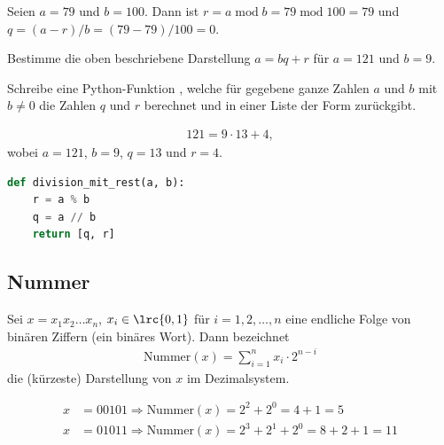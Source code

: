 \begin{myexample}
Seien $a=79$ und $b=100$. Dann ist  $r = a\; \text{mod}\; b = 79\; \text{mod}\; 100 = 79$ und $q = (a-r)/b = (79-79)/100 = 0$.
\end{myexample}

\begin{myexercise}
	\begin{aenum}
		\item Bestimme die oben beschriebene Darstellung $a = bq + r$ für $a = 121$ und $b = 9$.
		\item Schreibe eine Python-Funktion , welche für gegebene ganze Zahlen $a$ und $b$ mit $b \neq 0$ die Zahlen $q$ und $r$ berechnet und in einer Liste der Form \pythoninline{[q, r]} zurückgibt.
	\end{aenum}
	\begin{myanswer}
		\begin{aenum}
			\item \begin{align*}
				121 = 9\cdot 13 + 4,
			\end{align*}
			wobei $a = 121$, $b = 9$, $q = 13$ und $r = 4$.
			\item \phantom{1}
			\begin{lstlisting}[language=Python,caption=Division mit Rest,numbers=none]
def division_mit_rest(a, b):
    r = a % b
    q = a // b
    return [q, r]
\end{lstlisting}
		\end{aenum}
	\end{myanswer}
\end{myexercise}

\subsection{Nummer}
Sei $x=x_1x_2\ldots x_n$, $x_i\in\lrc{0,1}$ für $i=1,2,\ldots, n$ eine endliche Folge von binären Ziffern (ein binäres Wort). Dann bezeichnet
\begin{align}
	\text{Nummer}(x)=\displaystyle\sum_{i=1}^n x_i\cdot 2^{n-i}
\end{align}
die (kürzeste) Darstellung von $x$ im Dezimalsystem.

\begin{myexample}
\begin{align*}
	x & = 00101 \Rightarrow \text{Nummer}(x) = 2^2 + 2^0 = 4 + 1 = 5            \\
	x & = 01011 \Rightarrow \text{Nummer}(x) = 2^3 + 2^1  + 2^0 = 8+ 2 + 1 = 11
\end{align*}
\end{myexample}

